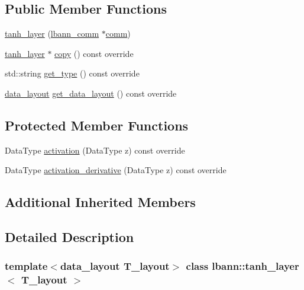\subsection*{Public Member Functions}
\begin{DoxyCompactItemize}
\item 
\hyperlink{classlbann_1_1tanh__layer_a24f9a6d92637571583267c5ad7bc9e84}{tanh\+\_\+layer} (\hyperlink{classlbann_1_1lbann__comm}{lbann\+\_\+comm} $\ast$\hyperlink{file__io_8cpp_ab048c6f9fcbcfaa57ce68b00263dbebe}{comm})
\item 
\hyperlink{classlbann_1_1tanh__layer}{tanh\+\_\+layer} $\ast$ \hyperlink{classlbann_1_1tanh__layer_ad42d3814131e6d8588c1cb4bfba8ebb6}{copy} () const override
\item 
std\+::string \hyperlink{classlbann_1_1tanh__layer_a756fe7a6c9f9f7d3a43f2a507a76b6d8}{get\+\_\+type} () const override
\item 
\hyperlink{base_8hpp_a786677cbfb3f5677b4d84f3056eb08db}{data\+\_\+layout} \hyperlink{classlbann_1_1tanh__layer_acf07ab3db6f429d8bd7dd0dd659ea3e0}{get\+\_\+data\+\_\+layout} () const override
\end{DoxyCompactItemize}
\subsection*{Protected Member Functions}
\begin{DoxyCompactItemize}
\item 
Data\+Type \hyperlink{classlbann_1_1tanh__layer_a48df029cc99589384dec7de3d7d77ad0}{activation} (Data\+Type z) const override
\item 
Data\+Type \hyperlink{classlbann_1_1tanh__layer_abd215b554cdb1e6eed1c651772a227e9}{activation\+\_\+derivative} (Data\+Type z) const override
\end{DoxyCompactItemize}
\subsection*{Additional Inherited Members}


\subsection{Detailed Description}
\subsubsection*{template$<$data\+\_\+layout T\+\_\+layout$>$\newline
class lbann\+::tanh\+\_\+layer$<$ T\+\_\+layout $>$}

